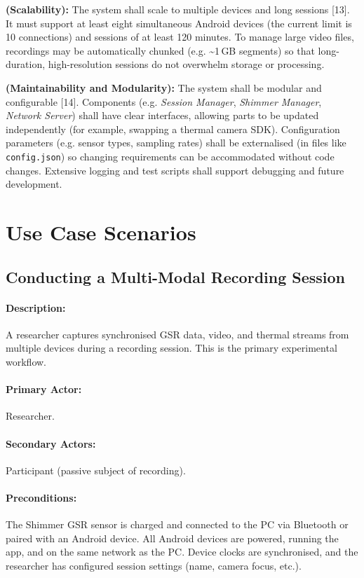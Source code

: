 \begin{description}[style=unboxed,leftmargin=0cm]
    \item[\textbf{NFR7}] \textbf{(Scalability):} The system shall scale to multiple devices and long sessions [13]. It must support at least eight simultaneous Android devices (the current limit is 10 connections) and sessions of at least 120 minutes. To manage large video files, recordings may be automatically chunked (e.g. \textasciitilde1\,GB segments) so that long-duration, high-resolution sessions do not overwhelm storage or processing.

    \item[\textbf{NFR8}] \textbf{(Maintainability and Modularity):} The system shall be modular and configurable [14]. Components (e.g. \textit{Session Manager}, \textit{Shimmer Manager}, \textit{Network Server}) shall have clear interfaces, allowing parts to be updated independently (for example, swapping a thermal camera SDK). Configuration parameters (e.g. sensor types, sampling rates) shall be externalised (in files like \texttt{config.json}) so changing requirements can be accommodated without code changes. Extensive logging and test scripts shall support debugging and future development.
\end{description}

\section{Use Case Scenarios}

\subsection{Conducting a Multi-Modal Recording Session}
\paragraph{Description:} A researcher captures synchronised GSR data, video, and thermal streams from multiple devices during a recording session. This is the primary experimental workflow.
\paragraph{Primary Actor:} Researcher.
\paragraph{Secondary Actors:} Participant (passive subject of recording).
\paragraph{Preconditions:} The Shimmer GSR sensor is charged and connected to the PC via Bluetooth or paired with an Android device. All Android devices are powered, running the app, and on the same network as the PC. Device clocks are synchronised, and the researcher has configured session settings (name, camera focus, etc.).
